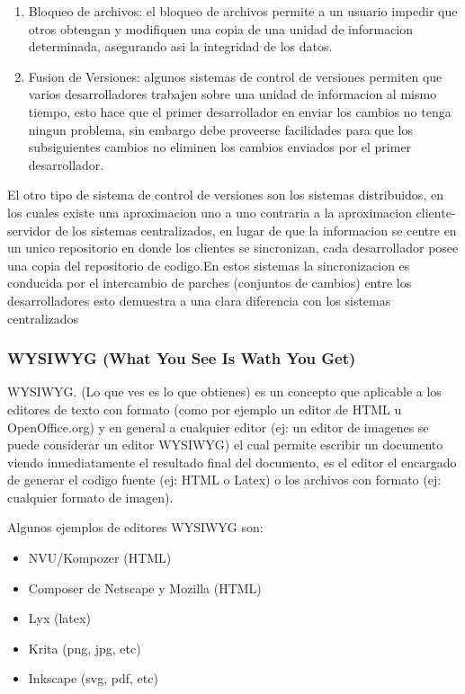 \begin{enumerate}

	\item Bloqueo de archivos: el bloqueo de archivos permite a un usuario impedir que otros obtengan y modifiquen una copia de una unidad de informacion determinada, asegurando asi la integridad de los datos.
	
	\item Fusion de Versiones: algunos sistemas de control de versiones permiten que varios desarrolladores trabajen sobre una unidad de informacion al mismo tiempo, esto hace que el primer desarrollador en enviar los cambios no tenga ningun problema, sin embargo debe proveerse facilidades para que los subsiguientes cambios no eliminen los cambios enviados por el primer desarrollador.

\end{enumerate}

El otro tipo de sistema de control de versiones son los sistemas distribuidos, en los cuales existe una aproximacion uno a uno contraria a la aproximacion cliente-servidor de los sistemas centralizados, en lugar de que la informacion se centre en un unico repositorio en donde los clientes se sincronizan, cada desarrollador posee una copia del repositorio de codigo.\newline En estos sistemas la sincronizacion es conducida por el intercambio de parches (conjuntos de cambios) entre los desarrolladores esto demuestra a una clara diferencia con los sistemas centralizados

\subsubsection*{WYSIWYG (What You See Is Wath You Get)}

WYSIWYG. (Lo que ves es lo que obtienes) es un concepto que aplicable a los editores de texto con formato (como por ejemplo un editor de HTML u OpenOffice.org) y en general a cualquier editor (ej: un editor de imagenes se puede considerar un editor WYSIWYG) el cual permite escribir un documento viendo inmediatamente el resultado final del documento, es el editor el encargado de generar el codigo fuente (ej: HTML o Latex) o los archivos con formato (ej: cualquier formato de imagen).

Algunos ejemplos de editores WYSIWYG son:

\begin{itemize}

	\item NVU/Kompozer (HTML)
	\item Composer de Netscape y Mozilla (HTML)
	\item Lyx (latex)
	\item Krita (png, jpg, etc)
	\item Inkscape (svg, pdf, etc)

\end{itemize}


